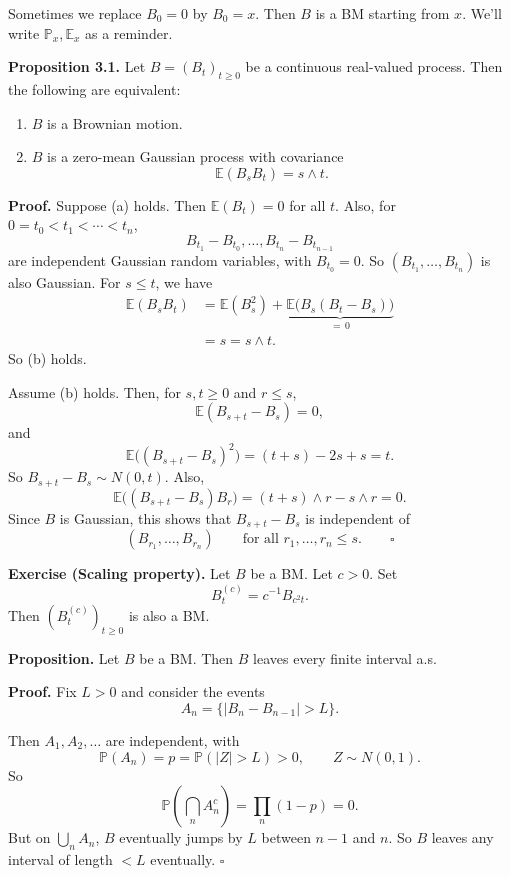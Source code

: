 \documentclass[11pt,a4paper]{article}
\begin{document}
Sometimes we replace $B_0=0$ by $B_0=x$. Then $B$ is a BM starting
from $x$. We'll write $\mathbb P_x,\mathbb E_x$ as a reminder.

\medskip
\noindent\textbf{Proposition 3.1.}
Let $B=(B_t)_{t\geq0}$ be a continuous real-valued process.
Then the following are equivalent:
\begin{enumerate}
    \item[(a)] $B$ is a Brownian motion.

    \item[(b)] $B$ is a zero-mean Gaussian process with covariance
    \[
    \mathbb E(B_sB_t)=s\wedge t.
    \]
\end{enumerate}

\noindent\textbf{Proof.}
Suppose (a) holds. Then $\mathbb E(B_t)=0$ for all $t$.
Also, for $0=t_0<t_1<\cdots<t_n$,
\[
B_{t_1}-B_{t_0},\ldots,B_{t_n}-B_{t_{n-1}}
\]
are independent Gaussian random variables, with $B_{t_0}=0$.
So $(B_{t_1},\ldots,B_{t_n})$ is also Gaussian.
For $s\leq t$, we have
\[
\begin{aligned}
\mathbb E(B_sB_t)
&=\mathbb E(B_s^2)
  +\underbrace{\mathbb E\bigl(B_s(B_t-B_s)\bigr)}_{=\,0}\\
&=s=s\wedge t.
\end{aligned}
\]
So (b) holds.

Assume (b) holds. Then, for $s,t\geq0$ and $r\leq s$,
\[
\mathbb E(B_{s+t}-B_s)=0,
\]
and
\[
\mathbb E\bigl((B_{s+t}-B_s)^2\bigr)
=(t+s)-2s+s=t.
\]
So $B_{s+t}-B_s\sim N(0,t)$. Also,
\[
\mathbb E\bigl((B_{s+t}-B_s)B_r\bigr)
=(t+s)\wedge r-s\wedge r=0.
\]
Since $B$ is Gaussian, this shows that $B_{s+t}-B_s$ is independent
of
\[
(B_{r_1},\ldots,B_{r_n})
\qquad\text{for all }r_1,\ldots,r_n\leq s.
\qquad\square
\]

\medskip
\noindent\textbf{Exercise (Scaling property).}
Let $B$ be a BM. Let $c>0$. Set
\[
B_t^{(c)}=c^{-1}B_{c^2t}.
\]
Then $(B_t^{(c)})_{t\geq0}$ is also a BM.

\medskip
\begin{samepage}
\noindent\textbf{Proposition.}
Let $B$ be a BM. Then $B$ leaves every finite interval a.s.

\noindent\textbf{Proof.}
Fix $L>0$ and consider the events
\[
A_n=\{|B_n-B_{n-1}|>L\}.
\]
\end{samepage}
Then $A_1,A_2,\ldots$ are independent, with
\[
\mathbb P(A_n)=p=\mathbb P(|Z|>L)>0,
\qquad Z\sim N(0,1).
\]
So
\[
\mathbb P\!\left(\bigcap_n A_n^c\right)
=\prod_n(1-p)=0.
\]
But on $\bigcup_n A_n$, $B$ eventually jumps by $L$ between
$n-1$ and $n$. So $B$ leaves any interval of length $<L$ eventually.
\hfill$\square$
\end{document}
